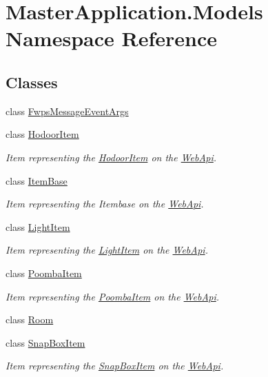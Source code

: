 \hypertarget{namespace_master_application_1_1_models}{}\section{Master\+Application.\+Models Namespace Reference}
\label{namespace_master_application_1_1_models}
\subsection*{Classes}
\begin{DoxyCompactItemize}
\item 
class \mbox{\hyperlink{class_master_application_1_1_models_1_1_fwps_message_event_args}{Fwps\+Message\+Event\+Args}}
\item 
class \mbox{\hyperlink{class_master_application_1_1_models_1_1_hodoor_item}{Hodoor\+Item}}
\begin{DoxyCompactList}\small\item\em Item representing the \mbox{\hyperlink{class_master_application_1_1_models_1_1_hodoor_item}{Hodoor\+Item}} on the \mbox{\hyperlink{namespace_web_api}{Web\+Api}}. \end{DoxyCompactList}\item 
class \mbox{\hyperlink{class_master_application_1_1_models_1_1_item_base}{Item\+Base}}
\begin{DoxyCompactList}\small\item\em Item representing the Itembase on the \mbox{\hyperlink{namespace_web_api}{Web\+Api}}. \end{DoxyCompactList}\item 
class \mbox{\hyperlink{class_master_application_1_1_models_1_1_light_item}{Light\+Item}}
\begin{DoxyCompactList}\small\item\em Item representing the \mbox{\hyperlink{class_master_application_1_1_models_1_1_light_item}{Light\+Item}} on the \mbox{\hyperlink{namespace_web_api}{Web\+Api}}. \end{DoxyCompactList}\item 
class \mbox{\hyperlink{class_master_application_1_1_models_1_1_poomba_item}{Poomba\+Item}}
\begin{DoxyCompactList}\small\item\em Item representing the \mbox{\hyperlink{class_master_application_1_1_models_1_1_poomba_item}{Poomba\+Item}} on the \mbox{\hyperlink{namespace_web_api}{Web\+Api}}. \end{DoxyCompactList}\item 
class \mbox{\hyperlink{class_master_application_1_1_models_1_1_room}{Room}}
\item 
class \mbox{\hyperlink{class_master_application_1_1_models_1_1_snap_box_item}{Snap\+Box\+Item}}
\begin{DoxyCompactList}\small\item\em Item representing the \mbox{\hyperlink{class_master_application_1_1_models_1_1_snap_box_item}{Snap\+Box\+Item}} on the \mbox{\hyperlink{namespace_web_api}{Web\+Api}}. \end{DoxyCompactList}\end{DoxyCompactItemize}
